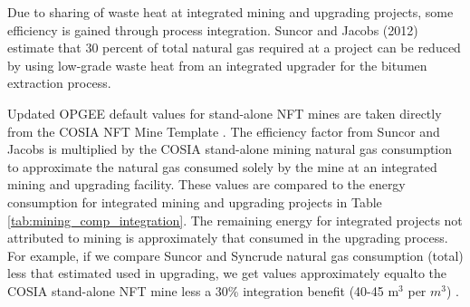 \documentclass[11pt]{report}
\begin{document}
Due to sharing of waste heat at integrated mining and upgrading projects, some efficiency is gained through process integration.  Suncor and Jacobs (2012) estimate that 30 percent of total natural gas required at a project can be reduced by using low-grade waste heat from an integrated upgrader for the bitumen extraction process.

Updated OPGEE default values for stand-alone NFT mines are taken directly from the COSIA NFT Mine Template \cite{COSIA2015b}. The efficiency factor from Suncor and Jacobs \cite{Jacobs2012} is multiplied by the COSIA stand-alone mining natural gas consumption to approximate the natural gas consumed solely by the mine at an integrated mining and upgrading facility. These values are compared to the energy consumption for integrated mining and upgrading projects in Table \ref{tab:mining_comp_integration}. The remaining energy for integrated projects not attributed to mining is approximately that consumed in the upgrading process.  For example, if we compare Suncor and Syncrude natural gas consumption (total) less that estimated used in upgrading, we get values approximately equalto the COSIA stand-alone NFT mine less a 30\% integration benefit (40-45 m$^3$ per $m^3$) .  
\end{document}
